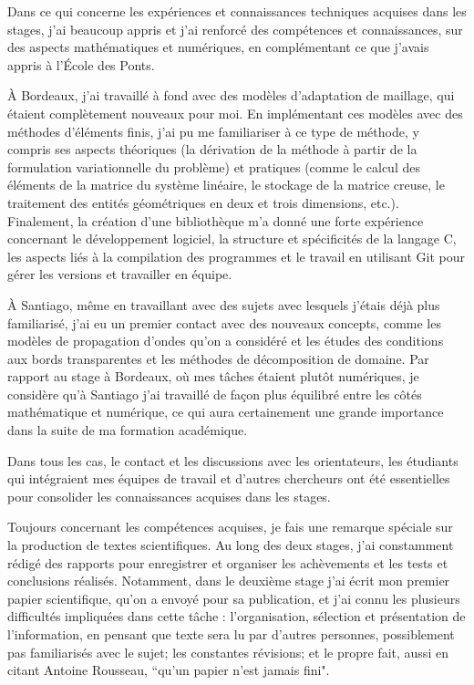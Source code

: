 \indent Dans ce qui concerne les expériences et connaissances techniques acquises dans les stages, j'ai beaucoup appris et j'ai renforcé des compétences et connaissances, sur des aspects mathématiques et numériques, en complémentant ce que j'avais appris à l'École des Ponts.

\indent À Bordeaux, j'ai travaillé à fond avec des modèles d'adaptation de maillage, qui étaient complètement nouveaux pour moi. En implémentant ces modèles avec des méthodes d'éléments finis, j'ai pu me familiariser à ce type de méthode, y compris ses aspects théoriques (la dérivation de la méthode à partir de la formulation variationnelle du problème) et pratiques (comme le calcul des éléments de la matrice du système linéaire, le stockage de la matrice creuse, le traitement des entités géométriques en deux et trois dimensions, etc.). Finalement, la création d'une bibliothèque m'a donné une forte expérience concernant le développement logiciel, la structure et spécificités de la langage C, les aspects liés à la compilation des programmes et le travail en utilisant Git pour gérer les versions et travailler en équipe.

\indent À Santiago, même en travaillant avec des sujets avec lesquels j'étais déjà plus familiarisé, j'ai eu un premier contact avec des nouveaux concepts, comme les modèles de propagation d'ondes qu'on a considéré et les études des conditions aux bords transparentes et les méthodes de décomposition de domaine. Par rapport au stage à Bordeaux, où mes tâches étaient plutôt numériques, je considère qu'à Santiago j'ai travaillé de façon plus équilibré entre les côtés mathématique et numérique, ce qui aura certainement une grande importance dans la suite de ma formation académique.

\indent Dans tous les cas, le contact et les discussions avec les orientateurs, les étudiants qui intégraient mes équipes de travail et d'autres chercheurs ont été essentielles pour consolider les connaissances acquises dans les stages.

\indent Toujours concernant les compétences acquises, je fais une remarque spéciale sur la production de textes scientifiques. Au long des deux stages, j'ai constamment rédigé des rapports pour enregistrer et organiser les achèvements et les tests et conclusions réalisés. Notamment, dans le deuxième stage j'ai écrit mon premier papier scientifique, qu'on a envoyé pour sa publication, et j'ai connu les plusieurs difficultés impliquées dans cette tâche : l'organisation, sélection et présentation de l'information, en pensant que texte sera lu par d'autres personnes, possiblement pas familiarisés avec le sujet; les constantes révisions; et le propre fait, aussi en citant Antoine Rousseau, ``qu'un papier n'est jamais fini".

